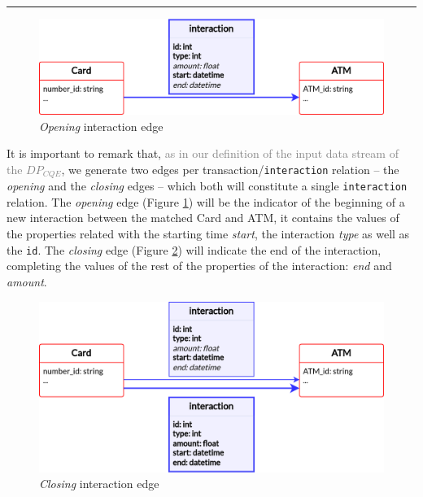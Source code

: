 \textcolor{red}{\rule{\linewidth}{0.5mm}}

\begin{figure}[h]
  \centering
  \includegraphics[scale = 0.8]{images/1-DataModel/2-edges-tx-tfm.png}
  \caption{\emph{Opening} interaction edge}
  \label{img:opening-edge}
\end{figure}

It is important to remark that, \textcolor{gray}{as in our definition of the input data stream of the $DP_{CQE}$}, we generate two edges per transaction/\texttt{interaction} relation -- the \emph{opening} and the \emph{closing} edges -- which both will constitute a single \texttt{interaction} relation. The \emph{opening} edge (Figure \ref{img:opening-edge}) will be the indicator of the beginning of a new interaction between the matched Card and ATM, it contains the values of the properties related with the starting time \emph{start}, the interaction \emph{type} as well as the \texttt{id}. The \emph{closing} edge (Figure \ref{img:closing-edge}) will indicate the end of the interaction, completing the values of the rest of the properties of the interaction: \emph{end} and \emph{amount}.

\begin{figure}[h]
  \centering
  \includegraphics[scale = 0.8]{images/1-DataModel/2-edges-tx-tfm-1.png}
  \caption{\emph{Closing} interaction edge}
  \label{img:closing-edge}
\end{figure}

